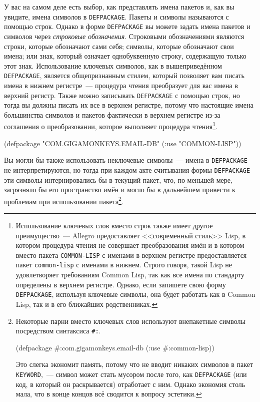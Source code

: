 У вас на самом деле есть выбор, как представлять имена пакетов и, как вы увидите, имена
символов в \lstinline{DEFPACKAGE}. Пакеты и символы называются с помощью строк. Однако в форме
\lstinline{DEFPACKAGE} вы можете задать имена пакетов и символов через \textit{строковые
  обозначения}. Строковыми обозначениями являются строки, которые обозначают сами себя;
символы, которые обозначают свои имена; или знак, который означает однобуквенную строку,
содержащую только этот знак. Использование ключевых символов, как в вышеприведённом
\lstinline{DEFPACKAGE}, является общепризнанным стилем, который позволяет вам писать имена в
нижнем регистре~--- процедура чтения преобразует для вас имена в верхний регистр.  Также можно
записывать \lstinline{DEFPACKAGE} с помощью строк, но тогда вы должны писать их все в верхнем
регистре, потому что настоящие имена большинства символов и пакетов фактически в верхнем
регистре из-за соглашения о преобразовании, которое выполняет
процедура чтения\footnote{Использование ключевых слов вместо строк также имеет другое
  преимущество~--- Allegro предоставляет <<современный стиль>> Lisp, в котором процедура чтения
  не совершает преобразования имён и в котором вместо пакета \lstinline{COMMON-LISP} с
  именами в верхнем регистре предоставляется пакет \lstinline{common-lisp} с именами в нижнем.
  Строго говоря, такой Lisp не удовлетворяет требованиям Common Lisp, так как все имена по
  стандарту определены в верхнем регистре. Однако, если запишете свою форму
  \lstinline{DEFPACKAGE}, используя ключевые символы, она будет работать как в Common Lisp, так
  и в его ближайших родственниках.}\hspace{\footnotenegspace}.

\begin{myverb}
(defpackage "COM.GIGAMONKEYS.EMAIL-DB"
  (:use "COMMON-LISP"))
\end{myverb}

Вы могли бы также использовать неключевые символы~--- имена в \lstinline{DEFPACKAGE} не
интерпретируются, но тогда при каждом акте считывания формы \lstinline{DEFPACKAGE} эти
символы интернировались бы в текущий пакет, что, по меньшей мере, загрязняло бы его
пространство имён и могло бы в дальнейшем привести к проблемам при использовании
пакета\footnote{Некоторые парни вместо ключевых слов используют внепакетные символы
  посредством синтаксиса \lstinline!#:!.

\begin{myverb}
(defpackage #:com.gigamonkeys.email-db
  (:use #:common-lisp))
\end{myverb}

Это слегка экономит память, потому что не вводит никаких символов в пакет
\lstinline{KEYWORD},~--- символ может стать мусором после того, как \lstinline{DEFPACKAGE} (или код,
в который он раскрывается) отработает с ним. Однако экономия столь мала, что в конце
концов всё сводится к вопросу эстетики.}\hspace{\footnotenegspace}.

